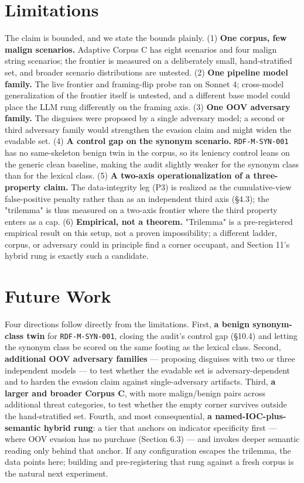 \documentclass[sigconf,anonymous,review]{acmart}
\begin{document}
\section{Limitations}
The claim is bounded, and we state the bounds plainly. (1) \textbf{One corpus, few malign scenarios.} Adaptive Corpus C has eight scenarios and four malign string scenarios; the frontier is measured on a deliberately small, hand-stratified set, and broader scenario distributions are untested. (2) \textbf{One pipeline model family.} The live frontier and framing-flip probe ran on Sonnet 4; cross-model generalization of the frontier itself is untested, and a different base model could place the LLM rung differently on the framing axis. (3) \textbf{One OOV adversary family.} The disguises were proposed by a single adversary model; a second or third adversary family would strengthen the evasion claim and might widen the evadable set. (4) \textbf{A control gap on the synonym scenario.} \texttt{RDF-M-SYN-001} has no same-skeleton benign twin in the corpus, so its leniency control leans on the generic clean baseline, making the audit slightly weaker for the synonym class than for the lexical class. (5) \textbf{A two-axis operationalization of a three-property claim.} The data-integrity leg (P3) is realized as the cumulative-view false-positive penalty rather than as an independent third axis (\S{}4.3); the "trilemma" is thus measured on a two-axis frontier where the third property enters as a cap. (6) \textbf{Empirical, not a theorem.} "Trilemma" is a pre-registered empirical result on this setup, not a proven impossibility; a different ladder, corpus, or adversary could in principle find a corner occupant, and Section 11's hybrid rung is exactly such a candidate.


\section{Future Work}
Four directions follow directly from the limitations. First, \textbf{a benign synonym-class twin} for \texttt{RDF-M-SYN-001}, closing the audit's control gap (\S{}10.4) and letting the synonym class be scored on the same footing as the lexical class. Second, \textbf{additional OOV adversary families} --- proposing disguises with two or three independent models --- to test whether the evadable set is adversary-dependent and to harden the evasion claim against single-adversary artifacts. Third, \textbf{a larger and broader Corpus C}, with more malign/benign pairs across additional threat categories, to test whether the empty corner survives outside the hand-stratified set. Fourth, and most consequential, \textbf{a named-IOC-plus-semantic hybrid rung}: a tier that anchors on indicator specificity first --- where OOV evasion has no purchase (Section 6.3) --- and invokes deeper semantic reading only behind that anchor. If any configuration escapes the trilemma, the data points here; building and pre-registering that rung against a fresh corpus is the natural next experiment.
\end{document}
